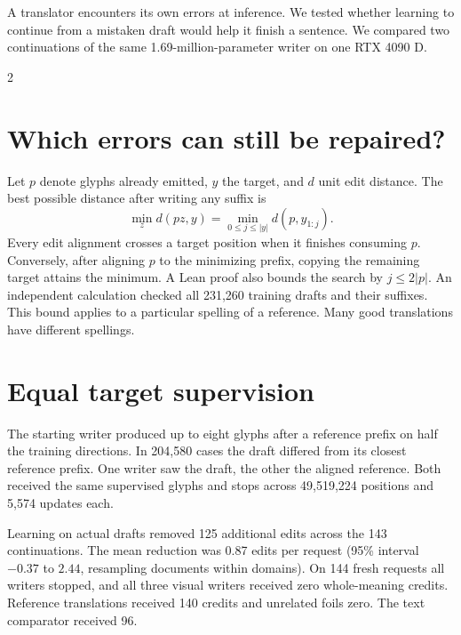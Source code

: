 \newpage
{}
\noindent A translator encounters its own errors at inference. We tested whether learning to continue from a mistaken draft would help it finish a sentence. We compared two continuations of the same 1.69-million-parameter writer on one RTX 4090 D.
\begin{multicols}{2}
\section*{Which errors can still be repaired?}
Let $p$ denote glyphs already emitted, $y$ the target, and $d$ unit edit distance. The best possible distance after writing any suffix is
\[
\min_z d(pz,y)=\min_{0\le j\le |y|}d(p,y_{1:j}).
\]
Every edit alignment crosses a target position when it finishes consuming $p$. Conversely, after aligning $p$ to the minimizing prefix, copying the remaining target attains the minimum. A Lean proof also bounds the search by $j\le 2|p|$. An independent calculation checked all 231,260 training drafts and their suffixes. This bound applies to a particular spelling of a reference. Many good translations have different spellings.
\section*{Equal target supervision}
The starting writer produced up to eight glyphs after a reference prefix on half the training directions. In 204,580 cases the draft differed from its closest reference prefix. One writer saw the draft, the other the aligned reference. Both received the same supervised glyphs and stops across 49,519,224 positions and 5,574 updates each.
\par Learning on actual drafts removed 125 additional edits across the 143 continuations. The mean reduction was 0.87 edits per request (95\% interval $-0.37$ to $2.44$, resampling documents within domains). On 144 fresh requests all writers stopped, and all three visual writers received zero whole-meaning credits. Reference translations received 140 credits and unrelated foils zero. The text comparator received 96.
\end{multicols}
